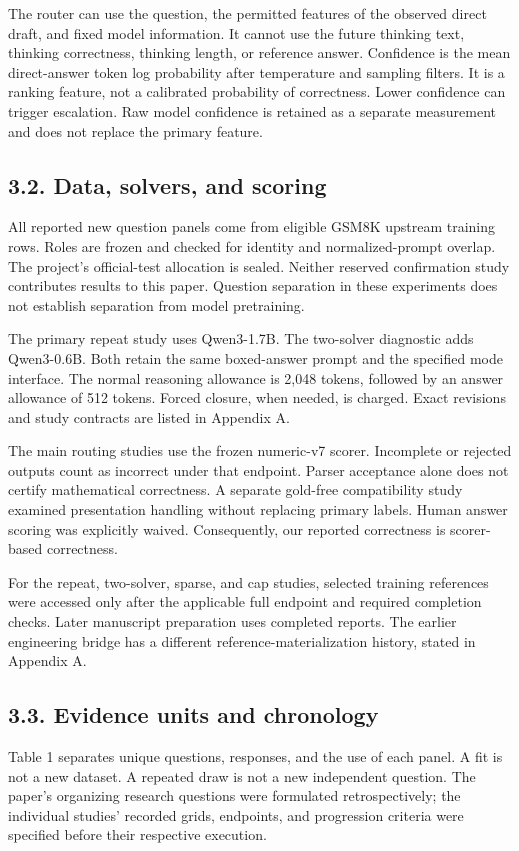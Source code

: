 \documentclass[11pt,a4paper]{article}
\begin{document}
The router can use the question, the permitted features of the observed direct draft, and fixed model information. It cannot use the future thinking text, thinking correctness, thinking length, or reference answer. Confidence is the mean direct-answer token log probability after temperature and sampling filters. It is a ranking feature, not a calibrated probability of correctness. Lower confidence can trigger escalation. Raw model confidence is retained as a separate measurement and does not replace the primary feature.

\subsection*{3.2. Data, solvers, and scoring}\label{sec:32-data-solvers-and-scoring}
All reported new question panels come from eligible GSM8K upstream training rows. Roles are frozen and checked for identity and normalized-prompt overlap. The project's official-test allocation is sealed. Neither reserved confirmation study contributes results to this paper. Question separation in these experiments does not establish separation from model pretraining.

The primary repeat study uses Qwen3-1.7B. The two-solver diagnostic adds Qwen3-0.6B. Both retain the same boxed-answer prompt and the specified mode interface. The normal reasoning allowance is 2,048 tokens, followed by an answer allowance of 512 tokens. Forced closure, when needed, is charged. Exact revisions and study contracts are listed in Appendix A.

The main routing studies use the frozen numeric-v7 scorer. Incomplete or rejected outputs count as incorrect under that endpoint. Parser acceptance alone does not certify mathematical correctness. A separate gold-free compatibility study examined presentation handling without replacing primary labels. Human answer scoring was explicitly waived. Consequently, our reported correctness is scorer-based correctness.

For the repeat, two-solver, sparse, and cap studies, selected training references were accessed only after the applicable full endpoint and required completion checks. Later manuscript preparation uses completed reports. The earlier engineering bridge has a different reference-materialization history, stated in Appendix A.

\subsection*{3.3. Evidence units and chronology}\label{sec:33-evidence-units-and-chronology}
Table 1 separates unique questions, responses, and the use of each panel. A fit is not a new dataset. A repeated draw is not a new independent question. The paper's organizing research questions were formulated retrospectively; the individual studies' recorded grids, endpoints, and progression criteria were specified before their respective execution.
\end{document}
